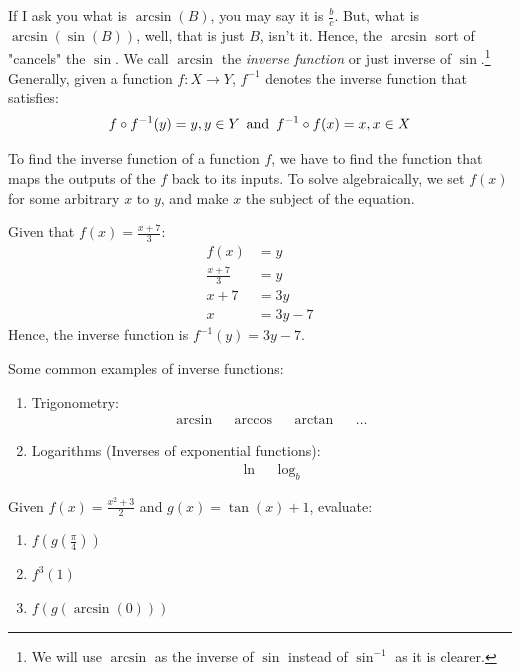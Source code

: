 If I ask you what is \(\arcsin(B)\), you may say it is \(\frac{b}{c}\). But, what is \(\arcsin(\sin(B))\), well, that is just \(B\), isn't it. Hence, the \(\arcsin\) sort of "cancels" the \(\sin\). We call \(\arcsin\) the \emph{inverse function} or just inverse of \(\sin\).\footnote{We will use \(\arcsin\) as the inverse of \(\sin\) instead of \(\sin^{-1}\) as it is clearer.} Generally, given a function \(f: X \to Y\), \(f^{-1}\) denotes the inverse function that satisfies:
\begin{equation}
  f \circ f^{-1}(y) = y, y \in Y \text{\, and \,} f^{-1} \circ f(x) = x, x \in X
\end{equation}



To find the inverse function of a function \(f\), we have to find the function that maps the outputs of the \(f\) back to its inputs. To solve algebraically, we set \(f(x)\) for some arbitrary \(x\) to \(y\), and make \(x\) the subject of the equation.
\begin{example}
  Given that \(f(x)=\frac{x+7}{3}\):
  \begin{align*}
    f(x)&=y \\
    \frac{x+7}{3}&=y \\
    x+7&=3y \\
    x&=3y-7
  \end{align*}
  Hence, the inverse function is \(f^{-1}(y)=3y-7\).
\end{example}
\begin{example}
  Some common examples of inverse functions:
  \begin{enumerate}
    \item{Trigonometry: \begin{align*}
        \arcsin && \arccos && \arctan && \dots 
    \end{align*} } 
  \item{Logarithms (Inverses of exponential functions): \begin{align*}
      \ln && \log_{b} 
  \end{align*} }
  \end{enumerate}
\end{example}
\begin{problem}

  Given \(f(x)=\frac{x^2+3}{2}\) and \(g(x)=\tan(x)+1\), evaluate:
  \begin{enumerate}[label=\alph*)]
    \item{\(f(g(\frac{\pi}{4}))\)}
    \item{\(f^{3}(1)\)}
    \item{\(f(g(\arcsin(0)))\)}
  \end{enumerate}

\end{problem}
